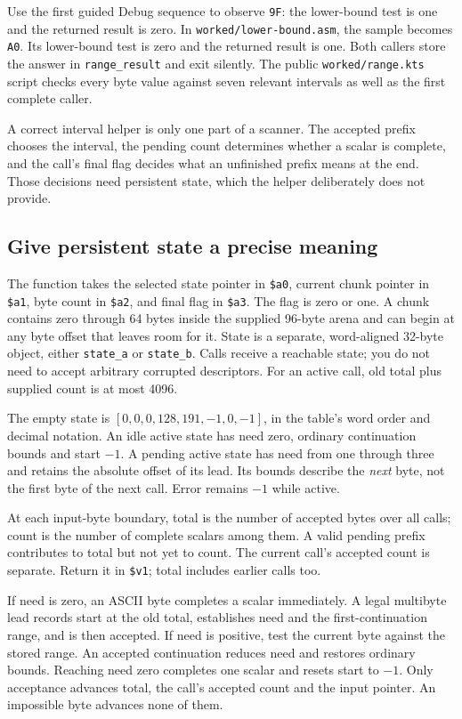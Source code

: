Use the first guided Debug sequence to observe \texttt{9F}: the lower-bound test
is one and the returned result is zero. In \texttt{worked/lower-bound.asm}, the
sample becomes \texttt{A0}. Its lower-bound test is zero and the returned result
is one. Both callers store the answer in \texttt{range\_result} and exit silently.
The public \texttt{worked/range.kts} script checks every byte value against seven
relevant intervals as well as the first complete caller.

A correct interval helper is only one part of a scanner. The accepted prefix
chooses the interval, the pending count determines whether a scalar is complete,
and the call's final flag decides what an unfinished prefix means at the end.
Those decisions need persistent state, which the helper deliberately does not
provide.

\subsection*{Give persistent state a precise meaning}

The function takes the selected state pointer in \texttt{\$a0}, current chunk
pointer in \texttt{\$a1}, byte count in \texttt{\$a2}, and final flag in
\texttt{\$a3}. The flag is zero or one. A chunk contains zero through 64 bytes
inside the supplied 96-byte arena and can begin at any byte offset that leaves
room for it. State is a separate, word-aligned 32-byte object, either
\texttt{state\_a} or \texttt{state\_b}. Calls receive a reachable state; you do
not need to accept arbitrary corrupted descriptors. For an active call, old total
plus supplied count is at most 4096.



The empty state is $[0,0,0,128,191,-1,0,-1]$, in the table's word order and decimal
notation. An idle active state has need zero, ordinary continuation bounds and
start $-1$. A pending active state has need from one through three and retains
the absolute offset of its lead. Its bounds describe the \emph{next} byte, not
the first byte of the next call. Error remains $-1$ while active.

At each input-byte boundary, total is the number of accepted bytes over all calls;
count is the number of complete scalars among them. A valid pending prefix
contributes to total but not yet to count. The current call's accepted count is
separate. Return it in \texttt{\$v1}; total includes earlier calls too.

If need is zero, an ASCII byte completes a scalar immediately. A legal multibyte
lead records start at the old total, establishes need and the first-continuation
range, and is then accepted. If need is positive, test the current byte against
the stored range. An accepted continuation reduces need and restores ordinary
bounds. Reaching need zero completes one scalar and resets start to $-1$.
Only acceptance advances total, the call's accepted count and the input pointer.
An impossible byte advances none of them.

